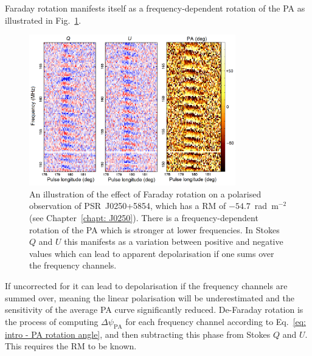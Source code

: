 Faraday rotation manifests itself as a frequency-dependent rotation of the PA as illustrated in Fig.~\ref{fig: intro - RM illustration}.
\begin{figure}
	\centering
	\includegraphics[width=0.8\textwidth]{Figures/Introduction/RM_data}
    \caption[The effect of Faraday rotation on polarisation]{An illustration of the effect of Faraday rotation on a polarised observation of PSR~J0250+5854, which has a RM of $-54.7$~rad~m$^{-2}$ (see Chapter~\ref{chapt: J0250}). There is a frequency-dependent rotation of the PA which is stronger at lower frequencies. In Stokes $Q$ and $U$ this manifests as a variation between positive and negative values which can lead to apparent depolarisation if one sums over the frequency channels.}
    \label{fig: intro - RM illustration} 
\end{figure}
If uncorrected for it can lead to depolarisation if the frequency channels are summed over, meaning the linear polarisation will be underestimated and the sensitivity of the average PA curve significantly reduced. De-Faraday rotation is the process of computing $\Delta\psi_\mathrm{PA}$ for each frequency channel according to Eq.~\eqref{eq: intro - PA rotation angle}, and then subtracting this phase from Stokes $Q$ and $U$. This requires the RM to be known.

